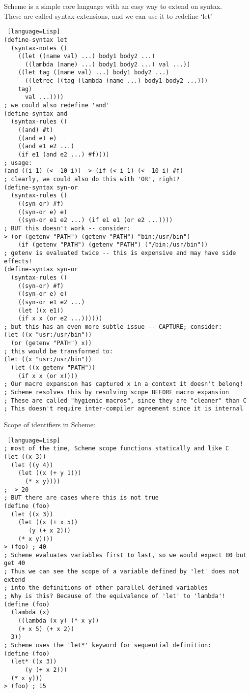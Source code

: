 \documentclass[../../lecture_notes.tex]{subfiles}
\begin{document}
\noindent Scheme is a simple core language with an easy way to extend on syntax.\\
These are called syntax extensions, and we can use it to redefine ‘let’
\begin{lstlisting} [language=Lisp]
(define-syntax let
  (syntax-notes ()
    ((let ((name val) ...) body1 body2 ...)
      ((lambda (name) ...) body1 body2 ...) val ...))
	((let tag ((name val) ...) body1 body2 ...)
	  ((letrec ((tag (lambda (name ...) body1 body2 ...)))
	tag)
      val ...))))
; we could also redefine 'and'
(define-syntax and
  (syntax-rules ()
    ((and) #t)
    ((and e) e)
    ((and e1 e2 ...)
    (if e1 (and e2 ...) #f))))
; usage:
(and ((i 1) (< -10 i)) -> (if (< i 1) (< -10 i) #f)
; clearly, we could also do this with 'OR', right?
(define-syntax syn-or
  (syntax-rules ()
    ((syn-or) #f)
    ((syn-or e) e)
    ((syn-or e1 e2 ...) (if e1 e1 (or e2 ...))))
; BUT this doesn't work -- consider:
> (or (getenv "PATH") (getenv "PATH") "bin:/usr/bin")
    (if (getenv "PATH") (getenv "PATH") ("/bin:/usr/bin"))
; getenv is evaluated twice -- this is expensive and may have side effects!
(define-syntax syn-or
  (syntax-rules ()
    ((syn-or) #f)
    ((syn-or e) e)
    ((syn-or e1 e2 ...)
    (let ((x e1))
    (if x x (or e2 ...))))))
; but this has an even more subtle issue -- CAPTURE; consider:
(let ((x "usr:/usr/bin"))
  (or (getenv "PATH") x))
; this would be transformed to:
(let ((x "usr:/usr/bin"))
  (let ((x getenv "PATH"))
    (if x x (or x))))
; Our macro expansion has captured x in a context it doesn't belong!
; Scheme resolves this by resolving scope BEFORE macro expansion
; These are called "hygienic macros", since they are "cleaner" than C
; This doesn't require inter-compiler agreement since it is internal
\end{lstlisting} \medskip

\noindent Scope of identifiers in Scheme:
\begin{lstlisting} [language=Lisp]
; most of the time, Scheme scope functions statically and like C
(let ((x 3))
  (let ((y 4))
    (let ((x (+ y 1)))
      (* x y))))
; -> 20
; BUT there are cases where this is not true
(define (foo)
  (let ((x 3))
    (let ((x (+ x 5))
	   (y (+ x 2)))
	(* x y))))
> (foo) ; 40
; Scheme evaluates variables first to last, so we would expect 80 but get 40
; Thus we can see the scope of a variable defined by 'let' does not extend
; into the definitions of other parallel defined variables
; Why is this? Because of the equivalence of 'let' to 'lambda'!
(define (foo)
  (lambda (x)
    ((lambda (x y) (* x y))
    (+ x 5) (+ x 2))
  3))
; Scheme uses the 'let*' keyword for sequential definition:
(define (foo)
  (let* ((x 3))
	  (y (+ x 2)))
  (* x y)))
> (foo) ; 15
\end{lstlisting}
\end{document}
